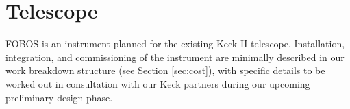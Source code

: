 \documentclass[oneside,11pt]{amsart}
\begin{document}



\section{Telescope}

FOBOS is an instrument planned for the existing Keck II telescope.
Installation, integration, and commissioning of the instrument are
minimally described in our work breakdown structure (see Section
\ref{sec:cost}), with specific details to be worked out in
consultation with our Keck partners during our upcoming preliminary
design phase.
 
\end{document}
